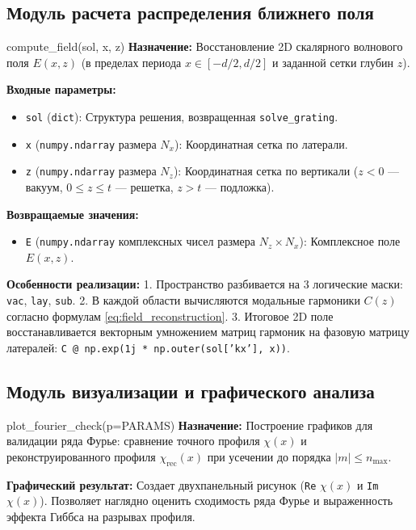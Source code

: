 \documentclass[a4paper,11pt]{article}
\begin{document}
\subsection{Модуль расчета распределения ближнего поля}

\begin{funcbox}{compute\_field(sol, x, z)}
\textbf{Назначение:} Восстановление 2D скалярного волнового поля $E(x, z)$ (в пределах периода $x \in [-d/2, d/2]$ и заданной сетки глубин $z$).

\textbf{Входные параметры:}
\begin{itemize}
    \item \texttt{sol} (\texttt{dict}): Структура решения, возвращенная \texttt{solve\_grating}.
    \item \texttt{x} (\texttt{numpy.ndarray} размера $N_x$): Координатная сетка по латерали.
    \item \texttt{z} (\texttt{numpy.ndarray} размера $N_z$): Координатная сетка по вертикали ($z < 0$ --- вакуум, $0 \le z \le t$ --- решетка, $z > t$ --- подложка).
\end{itemize}

\textbf{Возвращаемые значения:}
\begin{itemize}
    \item \texttt{E} (\texttt{numpy.ndarray} комплексных чисел размера $N_z \times N_x$): Комплексное поле $E(x, z)$.
\end{itemize}

\textbf{Особенности реализации:}
1. Пространство разбивается на 3 логические маски: \texttt{vac}, \texttt{lay}, \texttt{sub}.
2. В каждой области вычисляются модальные гармоники $C(z)$ согласно формулам \eqref{eq:field_reconstruction}.
3. Итоговое 2D поле восстанавливается векторным умножением матриц гармоник на фазовую матрицу латералей:
\texttt{C @ np.exp(1j * np.outer(sol['kx'], x))}.
\end{funcbox}

\subsection{Модуль визуализации и графического анализа}

\begin{funcbox}{plot\_fourier\_check(p=PARAMS)}
\textbf{Назначение:} Построение графиков для валидации ряда Фурье: сравнение точного профиля $\chi(x)$ и реконструированного профиля $\chi_{\text{rec}}(x)$ при усечении до порядка $|m| \le n_{\max}$.

\textbf{Графический результат:} Создает двухпанельный рисунок (\texttt{Re} $\chi(x)$ и \texttt{Im} $\chi(x)$). Позволяет наглядно оценить сходимость ряда Фурье и выраженность эффекта Гиббса на разрывах профиля.
\end{funcbox}
\end{document}
